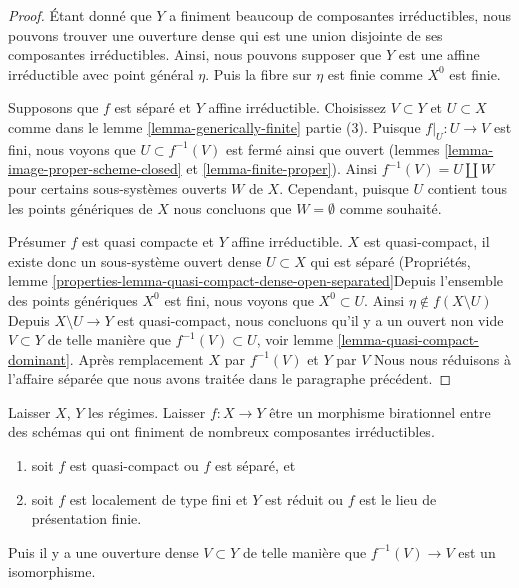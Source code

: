 \begin{proof}
Étant donné que $Y$ a finiment beaucoup de composantes irréductibles, nous pouvons trouver une ouverture dense qui est une union disjointe de ses composantes irréductibles. Ainsi, nous pouvons supposer que $Y$ est une affine irréductible avec point général $\eta$. Puis la fibre sur $\eta$ est finie comme $X^0$ est finie.

\medskip\noindent
Supposons que $f$ est séparé et $Y$ affine irréductible. Choisissez $V \subset Y$ et $U \subset X$ comme dans le lemme \ref{lemma-generically-finite} partie (3). Puisque $f|_U : U \to V$ est fini, nous voyons que $U \subset f^{-1}(V)$ est fermé ainsi que ouvert (lemmes \ref{lemma-image-proper-scheme-closed} et \ref{lemma-finite-proper}). Ainsi $f^{-1}(V) = U \amalg W$ pour certains sous-systèmes ouverts $W$ de $X$. Cependant, puisque $U$ contient tous les points génériques de $X$ nous concluons que $W = \emptyset$ comme souhaité.

\medskip\noindent

Présumer $f$ est quasi compacte et $Y$ affine irréductible. $X$ est quasi-compact, il existe donc un sous-système ouvert dense $U \subset X$
qui est séparé (Propriétés, lemme \ref{properties-lemma-quasi-compact-dense-open-separated}Depuis l'ensemble des points génériques $X^0$ est fini, nous voyons que $X^0 \subset U$. Ainsi $\eta \not \in f(X \setminus U)$Depuis $X \setminus U \to Y$ est quasi-compact, nous concluons qu'il y a un ouvert non vide $V \subset Y$
de telle manière que $f^{-1}(V) \subset U$, voir lemme \ref{lemma-quasi-compact-dominant}. Après remplacement $X$ par $f^{-1}(V)$ et $Y$ par $V$ Nous nous réduisons à l'affaire séparée que nous avons traitée dans le paragraphe précédent.

\end{proof}

\begin{lemma}

\label{lemma-birational-isomorphism-over-dense-open}

Laisser $X$, $Y$ les régimes. Laisser $f : X \to Y$ être un morphisme birationnel entre des schémas qui ont finiment de nombreux composantes irréductibles.

\begin{enumerate}

\item soit $f$ est quasi-compact ou $f$ est séparé, et
\item soit $f$ est localement de type fini et $Y$ est réduit ou
$f$ est le lieu de présentation finie.

\end{enumerate}

Puis il y a une ouverture dense $V \subset Y$
de telle manière que $f^{-1}(V) \to V$ est un isomorphisme.

\end{lemma}

